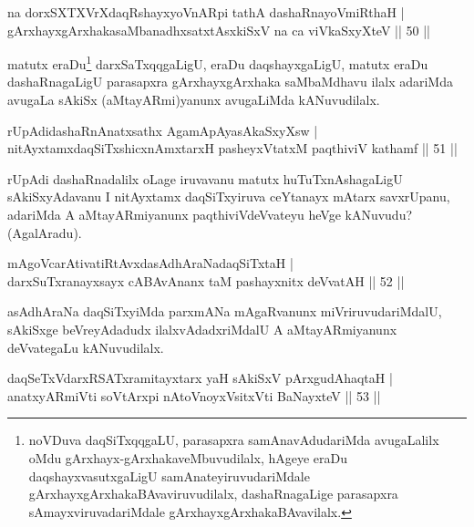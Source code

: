 \begin{shl}
na dorxSXTXVrXdaqRshayxyoVnARpi tathA dashaRnayoVmiRthaH |\\
gArxhayxgArxhakasaMbanadhxsatxtAsxkiSxV na ca viVkaSxyXteV \hfill || 50 ||
\end{shl}

\begin{artha}%
matutx eraDu\footnote{noVDuva daqSiTxqqgaLU, parasapxra samAnavAdudariMda avugaLalilx oMdu gArxhayx-gArxhakaveMbuvudilalx, hAgeye eraDu daqshayxvasutxgaLigU samAnateyiruvudariMdale gArxhayxgArxhakaBAvaviruvudilalx, dashaRnagaLige parasapxra sAmayxviruvadariMdale gArxhayxgArxhakaBAvavilalx.} darxSaTxqqgaLigU, eraDu daqshayxgaLigU, matutx eraDu dashaRnagaLigU parasapxra gArxhayxgArxhaka saMbaMdhavu ilalx adariMda avugaLa sAkiSx (aMtayARmi)yanunx avugaLiMda kANuvudilalx.
\end{artha}

\begin{shl}
rUpAdidashaRnAnatxsathx AgamApAyasAkaSxyXsw |\\
nitAyxtamxdaqSiTxshicxnAmxtarxH pasheyxVtatxM paqthiviV kathamf \hfill || 51 ||
\end{shl}

\begin{artha}
rUpAdi dashaRnadalilx oLage iruvavanu matutx huTuTxnAshagaLigU sAkiSxyAdavanu I nitAyxtamx daqSiTxyiruva ceYtanayx mAtarx savxrUpanu, adariMda A aMtayARmiyanunx paqthiviVdeVvateyu heVge kANuvudu? (AgalAradu).
\end{artha}

\begin{shl}
mAgoVcarAtivatiRtAvxdasAdhAraNadaqSiTxtaH |\\
darxSuTxranayxsayx cABAvAnanx taM pashayxnitx deVvatAH \hfill || 52 ||
\end{shl}

\begin{artha}
asAdhAraNa daqSiTxyiMda parxmANa mAgaRvanunx miVriruvudariMdalU, sAkiSxge beVreyAdadudx ilalxvAdadxriMdalU A aMtayARmiyanunx deVvategaLu kANuvudilalx.
\end{artha}


\begin{shl}
daqSeTxVdarxRSATxramitayxtarx yaH sAkiSxV pArxgudAhaqtaH |\\
anatxyARmiVti soV\s tArxpi nAtoV\s noyxV\s sitxVti BaNayxteV \hfill || 53 ||
\end{shl}

